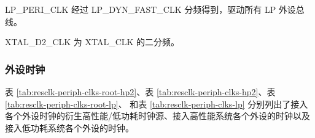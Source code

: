 \documentclass[main\_\_CN.tex]{subfiles}
\begin{document}
LP\_PERI\_CLK 经过 LP\_DYN\_FAST\_CLK 分频得到，驱动所有 LP 外设总线。

XTAL\_D2\_CLK 为 XTAL\_CLK 的二分频。



\subsubsection{外设时钟}\label{sec:peri_clk}

表 \ref{tab:resclk-periph-clks-root-hp2}、表 \ref{tab:resclk-periph-clks-hp2}、表 \ref{tab:resclk-periph-clks-root-lp}、 和表 \ref{tab:resclk-periph-clks-lp} 分别列出了接入各个外设时钟的衍生高性能/低功耗时钟源、接入高性能系统各个外设的时钟以及接入低功耗系统各个外设的时钟。



\begin{landscape}

\setlength\tabcolsep{0.8pt}

\begin{tiny}


\end{tiny}
\end{landscape}
\end{document}
